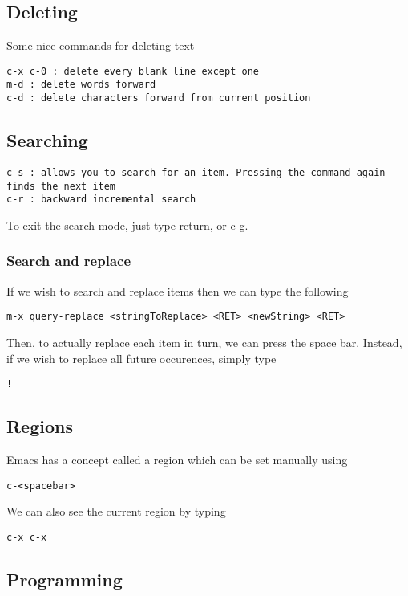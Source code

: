 \documentclass[a4paper, 10pt]{article}
\begin{document}
\subsection{Deleting}
\label{sec:deleting}

Some nice commands for deleting text
\begin{verbatim}
c-x c-0 : delete every blank line except one
m-d : delete words forward
c-d : delete characters forward from current position
\end{verbatim}

\subsection{Searching}
\label{sec:searching}

\begin{verbatim}
c-s : allows you to search for an item. Pressing the command again
finds the next item
c-r : backward incremental search
\end{verbatim}
To exit the search mode, just type return, or c-g.

\subsubsection{Search and replace}
\label{sec:search-replace}

If we wish to search and replace items then we can type the following
\begin{verbatim}
m-x query-replace <stringToReplace> <RET> <newString> <RET>
\end{verbatim}
Then, to actually replace each item in turn, we can press the space
bar. Instead, if we wish to replace all future occurences, simply type 
\begin{verbatim}
!
\end{verbatim}
\subsection*{Regions}
\label{sec:regions}

Emacs has a concept called a region which can be set manually using 
\begin{verbatim}
c-<spacebar>
\end{verbatim}

We can also see the current region by typing
\begin{verbatim}
c-x c-x
\end{verbatim}


\subsection*{Programming}
\end{document}
